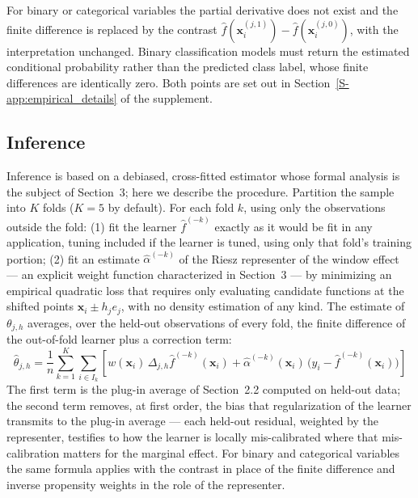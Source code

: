 \documentclass[12pt,a4paper]{article}
\numberwithin{equation}{section}
\theoremstyle{plain}
\theoremstyle{definition}
\newcommand{\Dh}{\Delta_{j,h}}
\begin{document}
	For binary or categorical variables the partial derivative does not exist and
	the finite difference is replaced by the contrast
	$\hat{f}(\mathbf{x}_i^{(j,1)}) - \hat{f}(\mathbf{x}_i^{(j,0)})$, with the
	interpretation unchanged. Binary classification models must return the
	estimated conditional probability rather than the predicted class label,
	whose finite differences are identically zero. Both points are set out in
	Section~\ref{S-app:empirical_details} of the supplement.

	\subsection{Inference}
	
	Inference is based on a debiased, cross-fitted estimator whose formal analysis is
	the subject of Section~3; here we describe the procedure. Partition the sample
	into $K$ folds ($K = 5$ by default). For each fold $k$, using only the
	observations outside the fold: (1) fit the learner $\hat{f}^{(-k)}$ exactly as it would be fit in any application, tuning included if the learner is tuned, using only that fold's training portion; (2) fit an estimate $\hat{\alpha}^{(-k)}$ of the Riesz
	representer of the window effect --- an explicit weight function characterized in
	Section~3 --- by minimizing an empirical quadratic loss that requires only
	evaluating candidate functions at the shifted points $\mathbf{x}_i \pm h_j e_j$,
	with no density estimation of any kind. The estimate of $\theta_{j,h}$ averages,
	over the held-out observations of every fold, the finite difference of the
	out-of-fold learner plus a correction term:
	\begin{equation}
		\hat{\theta}_{j,h} = \frac{1}{n} \sum_{k=1}^{K} \sum_{i \in I_k} \left[
		w(\mathbf{x}_i)\, \Dh \hat{f}^{(-k)}(\mathbf{x}_i)
		+ \hat{\alpha}^{(-k)}(\mathbf{x}_i)\,
		\bigl(y_i - \hat{f}^{(-k)}(\mathbf{x}_i)\bigr)
		\right]
	\end{equation}
	The first term is the plug-in average of Section~2.2 computed on held-out data;
	the second term removes, at first order, the bias that regularization of the
	learner transmits to the plug-in average --- each held-out residual, weighted by
	the representer, testifies to how the learner is locally mis-calibrated where
	that mis-calibration matters for the marginal effect. For binary and categorical
	variables the same formula applies with the contrast in place of the finite
	difference and inverse propensity weights in the role of the representer.
	
\end{document}
